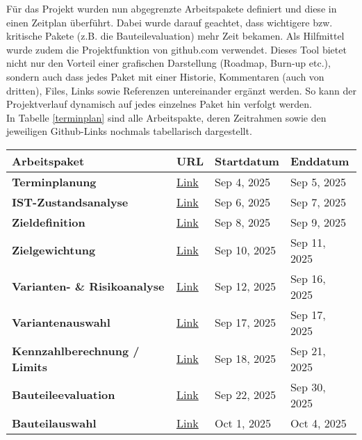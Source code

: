 Für das Projekt wurden nun abgegrenzte Arbeitspakete definiert und diese in einen Zeitplan überführt. Dabei wurde darauf geachtet, dass wichtigere bzw. kritische Pakete (z.B. die Bauteilevaluation) mehr Zeit bekamen. Als Hilfmittel wurde zudem die Projektfunktion von github.com verwendet. Dieses Tool bietet nicht nur den Vorteil einer grafischen Darstellung (Roadmap, Burn-up etc.), sondern auch dass jedes Paket mit einer Historie, Kommentaren (auch von dritten), Files, Links sowie Referenzen untereinander ergänzt werden. So kann der Projektverlauf dynamisch auf jedes einzelnes Paket hin verfolgt werden.\\In Tabelle \ref{terminplan} sind alle Arbeitspakte, deren Zeitrahmen sowie den jeweiligen Github-Links nochmals tabellarisch dargestellt.
\begin{table}[H]
	\centering
	\begin{tabularx}{412pt}{|l|l|l|l|}
		\textbf{Arbeitspaket} & \textbf{URL} & \textbf{Startdatum} & \textbf{Enddatum} \\\hline
		\textbf{Terminplanung} & \href{https://github.com/Violabitch5/Nathophone\_doc/issues/1}{Link} & Sep 4, 2025 & Sep 5, 2025 \\ 
		\textbf{IST-Zustandsanalyse} & \href{https://github.com/Violabitch5/Nathophone\_doc/issues/4}{Link} & Sep 6, 2025 & Sep 7, 2025 \\ 
		\textbf{Zieldefinition} & \href{https://github.com/Violabitch5/Nathophone\_doc/issues/3}{Link} & Sep 8, 2025 & Sep 9, 2025 \\ 
		\textbf{Zielgewichtung} & \href{https://github.com/Violabitch5/Nathophone\_doc/issues/5}{Link} & Sep 10, 2025 & Sep 11, 2025 \\ 
		\textbf{Varianten- \& Risikoanalyse} & \href{https://github.com/Violabitch5/Nathophone\_doc/issues/6}{Link} & Sep 12, 2025 & Sep 16, 2025 \\ 
		\textbf{Variantenauswahl} & \href{https://github.com/Violabitch5/Nathophone\_doc/issues/7}{Link} & Sep 17, 2025 & Sep 17, 2025 \\ 
		\hdashline
		\textbf{Kennzahlberechnung / Limits} & \href{https://github.com/Violabitch5/Nathophone\_elec/issues/1}{Link} & Sep 18, 2025 & Sep 21, 2025 \\ 
		\textbf{Bauteileevaluation} & \href{https://github.com/Violabitch5/Nathophone\_elec/issues/2}{Link} & Sep 22, 2025 & Sep 30, 2025 \\ 
		\textbf{Bauteilauswahl} & \href{https://github.com/Violabitch5/Nathophone\_elec/issues/3}{Link} & Oct 1, 2025 & Oct 4, 2025 \\ 

\end{tabularx}
\end{table}
